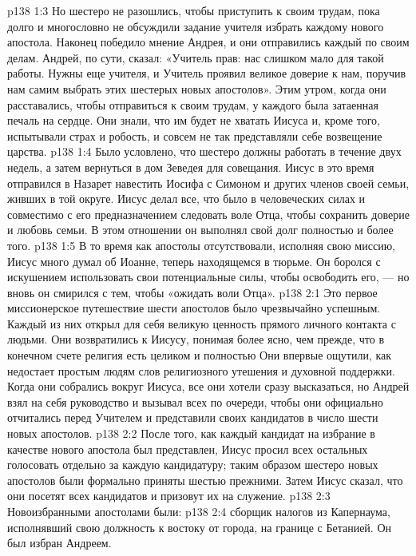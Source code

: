 \vs p138 1:3 Но шестеро не разошлись, чтобы приступить к своим трудам, пока долго и многословно не обсуждили задание учителя избрать каждому нового апостола. Наконец победило мнение Андрея, и они отправились каждый по своим делам. Андрей, по сути, сказал: «Учитель прав: нас слишком мало для такой работы. Нужны еще учителя, и Учитель проявил великое доверие к нам, поручив нам самим выбрать этих шестерых новых апостолов». Этим утром, когда они расставались, чтобы отправиться к своим трудам, у каждого была затаенная печаль на сердце. Они знали, что им будет не хватать Иисуса и, кроме того, испытывали страх и робость, и совсем не так представляли себе возвещение царства.
\vs p138 1:4 Было условлено, что шестеро должны работать в течение двух недель, а затем вернуться в дом Зеведея для совещания. Иисус в это время отправился в Назарет навестить Иосифа с Симоном и других членов своей семьи, живших в той округе. Иисус делал все, что было в человеческих силах и совместимо с его предназначением следовать воле Отца, чтобы сохранить доверие и любовь семьи. В этом отношении он выполнял свой долг полностью и более того.
\vs p138 1:5 В то время как апостолы отсутствовали, исполняя свою миссию, Иисус много думал об Иоанне, теперь находящемся в тюрьме. Он боролся с искушением использовать свои потенциальные силы, чтобы освободить его, --- но вновь он смирился с тем, чтобы «ожидать воли Отца».
\vs p138 2:1 Это первое миссионерское путешествие шести апостолов было чрезвычайно успешным. Каждый из них открыл для себя великую ценность прямого личного контакта с людьми. Они возвратились к Иисусу, понимая более ясно, чем прежде, что в конечном счете религия есть целиком и полностью  Они впервые ощутили, как недостает простым людям слов религиозного утешения и духовной поддержки. Когда они собрались вокруг Иисуса, все они хотели сразу высказаться, но Андрей взял на себя руководство и вызывал всех по очереди, чтобы они официально отчитались перед Учителем и представили своих кандидатов в число шести новых апостолов.
\vs p138 2:2 После того, как каждый кандидат на избрание в качестве нового апостола был представлен, Иисус просил всех остальных голосовать отдельно за каждую кандидатуру; таким образом шестеро новых апостолов были формально приняты шестью прежними. Затем Иисус сказал, что они посетят всех кандидатов и призовут их на служение.
\vs p138 2:3 Новоизбранными апостолами были:
\vs p138 2:4 \bibnobreakspace {} сборщик налогов из Капернаума, исполнявший свою должность к востоку от города, на границе с Бетанией. Он был избран Андреем.
